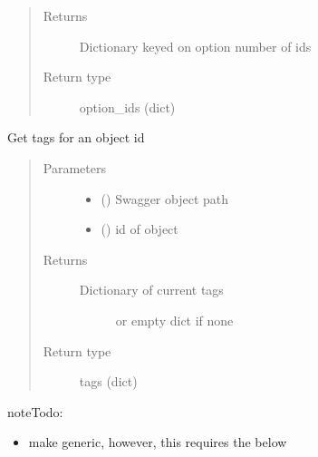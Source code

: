 \documentclass[letterpaper,10pt,english]{sphinxmanual}
\begin{document}
\begin{fulllineitems}
\begin{fulllineitems}
\begin{quote}
\begin{description}
\item[{Returns}] \leavevmode
\sphinxAtStartPar
Dictionary keyed on option number of ids

\item[{Return type}] \leavevmode
\sphinxAtStartPar
option\_ids (dict)

\end{description}\end{quote}

\end{fulllineitems}


\begin{fulllineitems}
\label{\detokenize{b1ddi-class:bloxone.b1ddi.get_tags}}
\sphinxAtStartPar
Get tags for an object id
\begin{quote}\begin{description}
\item[{Parameters}] \leavevmode\begin{itemize}
\item {} 
\sphinxAtStartPar
{} () \textendash{} Swagger object path

\item {} 
\sphinxAtStartPar
{} () \textendash{} id of object

\end{itemize}

\item[{Returns}] \leavevmode
\sphinxAtStartPar
\begin{description}
\item[{Dictionary of current tags}] \leavevmode
\sphinxAtStartPar
or empty dict if none

\end{description}


\item[{Return type}] \leavevmode
\sphinxAtStartPar
tags (dict)

\end{description}\end{quote}

\begin{sphinxadmonition}{note}{\label{\detokenize{b1ddi-class:id1}}Todo:}\begin{itemize}
\item {} 
\sphinxAtStartPar
make generic, however, this requires the below


\end{itemize}
\end{sphinxadmonition}
\end{fulllineitems}
\end{fulllineitems}
\end{document}
